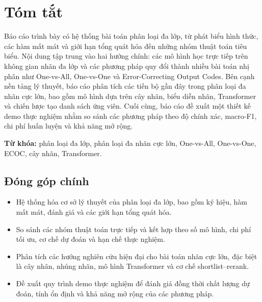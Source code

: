\section*{Tóm tắt}
{}

Báo cáo trình bày có hệ thống bài toán phân loại đa lớp, từ phát biểu hình thức, các hàm mất mát và giới hạn tổng quát hóa đến những nhóm thuật toán tiêu biểu. Nội dung tập trung vào hai hướng chính: các mô hình học trực tiếp trên không gian nhãn đa lớp và các phương pháp quy đổi thành nhiều bài toán nhị phân như One-vs-All, One-vs-One và Error-Correcting Output Codes. Bên cạnh nền tảng lý thuyết, báo cáo phân tích các tiến bộ gần đây trong phân loại đa nhãn cực lớn, bao gồm mô hình dựa trên cây nhãn, biểu diễn nhãn, Transformer và chiến lược tạo danh sách ứng viên. Cuối cùng, báo cáo đề xuất một thiết kế demo thực nghiệm nhằm so sánh các phương pháp theo độ chính xác, macro-F1, chi phí huấn luyện và khả năng mở rộng.

\noindent\textbf{Từ khóa:} phân loại đa lớp, phân loại đa nhãn cực lớn, One-vs-All, One-vs-One, ECOC, cây nhãn, Transformer.

\subsection*{Đóng góp chính}
{}

\begin{itemize}[leftmargin=2em]
  \item Hệ thống hóa cơ sở lý thuyết của phân loại đa lớp, bao gồm ký hiệu, hàm mất mát, đánh giá và các giới hạn tổng quát hóa.
  \item So sánh các nhóm thuật toán trực tiếp và kết hợp theo số mô hình, chi phí tối ưu, cơ chế dự đoán và hạn chế thực nghiệm.
  \item Phân tích các hướng nghiên cứu hiện đại cho bài toán nhãn cực lớn, đặc biệt là cây nhãn, nhúng nhãn, mô hình Transformer và cơ chế shortlist--rerank.
  \item Đề xuất quy trình demo thực nghiệm để đánh giá đồng thời chất lượng dự đoán, tính ổn định và khả năng mở rộng của các phương pháp.
\end{itemize}

\clearpage